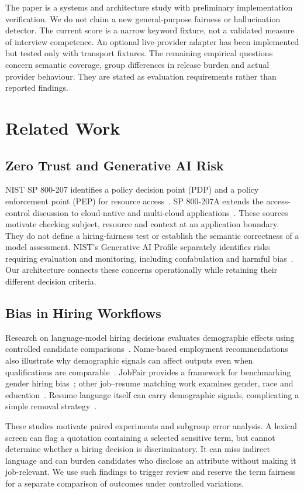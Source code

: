 \documentclass[conference]{IEEEtran}
\begin{document}
The paper is a systems and architecture study with preliminary implementation verification. We do not claim a new general-purpose fairness or hallucination detector. The current score is a narrow keyword fixture, not a validated measure of interview competence. An optional live-provider adapter has been implemented but tested only with transport fixtures. The remaining empirical questions concern semantic coverage, group differences in release burden and actual provider behaviour. They are stated as evaluation requirements rather than reported findings.

\section{Related Work}
\subsection{Zero Trust and Generative AI Risk}
NIST SP 800-207 identifies a policy decision point (PDP) and a policy enforcement point (PEP) for resource access~\cite{rose2020zero}. SP 800-207A extends the access-control discussion to cloud-native and multi-cloud applications~\cite{chandramouli2023zero}. These sources motivate checking subject, resource and context at an application boundary. They do not define a hiring-fairness test or establish the semantic correctness of a model assessment. NIST's Generative AI Profile separately identifies risks requiring evaluation and monitoring, including confabulation and harmful bias~\cite{nist2024genai}. Our architecture connects these concerns operationally while retaining their different decision criteria.

\subsection{Bias in Hiring Workflows}
Research on language-model hiring decisions evaluates demographic effects using controlled candidate comparisons~\cite{an2024discriminate}. Name-based employment recommendations also illustrate why demographic signals can affect outputs even when qualifications are comparable~\cite{nghiem2024name}. JobFair provides a framework for benchmarking gender hiring bias~\cite{wang2024jobfair}; other job--resume matching work examines gender, race and education~\cite{iso2025bias}. Resume language itself can carry demographic signals, complicating a simple removal strategy~\cite{parasurama2022gendered}.

These studies motivate paired experiments and subgroup error analysis. A lexical screen can flag a quotation containing a selected sensitive term, but cannot determine whether a hiring decision is discriminatory. It can miss indirect language and can burden candidates who disclose an attribute without making it job-relevant. We use such findings to trigger review and reserve the term fairness for a separate comparison of outcomes under controlled variations.
\end{document}

